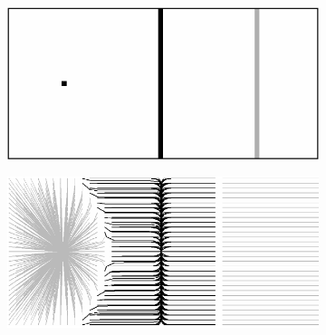 \documentclass{article}
\begin{document}
\begin{figure}[!h]
   \begin{subfigure}[c]{.5\linewidth}
     \centering
     \includegraphics[scale=0.45]{synthetic_map.png}
     \caption{}
   \end{subfigure} 
   \begin{subfigure}[c]{.5\linewidth}
     \centering
     \includegraphics[scale=0.45]{synthetic_map_GVF.png}
     \caption{}
   \end{subfigure} \\
   

\end{figure}
\end{document}
